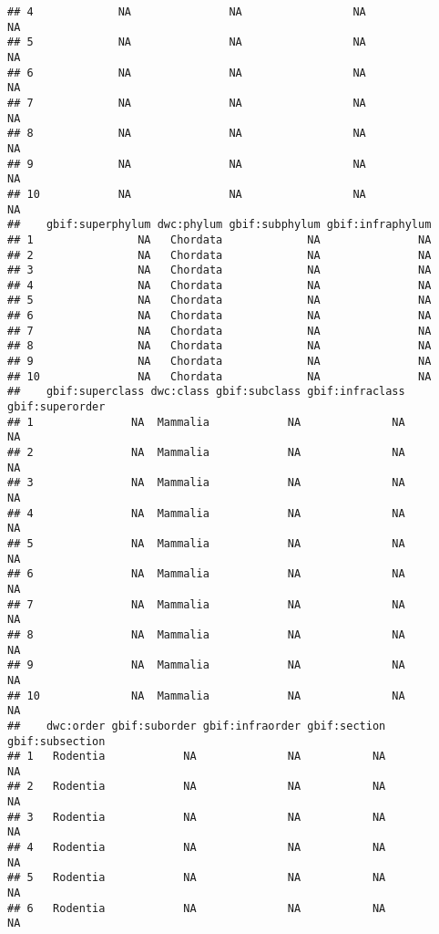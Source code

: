 \documentclass[]{book}
\begin{document}
\begin{verbatim}
## 4             NA               NA                 NA                NA
## 5             NA               NA                 NA                NA
## 6             NA               NA                 NA                NA
## 7             NA               NA                 NA                NA
## 8             NA               NA                 NA                NA
## 9             NA               NA                 NA                NA
## 10            NA               NA                 NA                NA
##    gbif:superphylum dwc:phylum gbif:subphylum gbif:infraphylum
## 1                NA   Chordata             NA               NA
## 2                NA   Chordata             NA               NA
## 3                NA   Chordata             NA               NA
## 4                NA   Chordata             NA               NA
## 5                NA   Chordata             NA               NA
## 6                NA   Chordata             NA               NA
## 7                NA   Chordata             NA               NA
## 8                NA   Chordata             NA               NA
## 9                NA   Chordata             NA               NA
## 10               NA   Chordata             NA               NA
##    gbif:superclass dwc:class gbif:subclass gbif:infraclass gbif:superorder
## 1               NA  Mammalia            NA              NA              NA
## 2               NA  Mammalia            NA              NA              NA
## 3               NA  Mammalia            NA              NA              NA
## 4               NA  Mammalia            NA              NA              NA
## 5               NA  Mammalia            NA              NA              NA
## 6               NA  Mammalia            NA              NA              NA
## 7               NA  Mammalia            NA              NA              NA
## 8               NA  Mammalia            NA              NA              NA
## 9               NA  Mammalia            NA              NA              NA
## 10              NA  Mammalia            NA              NA              NA
##    dwc:order gbif:suborder gbif:infraorder gbif:section gbif:subsection
## 1   Rodentia            NA              NA           NA              NA
## 2   Rodentia            NA              NA           NA              NA
## 3   Rodentia            NA              NA           NA              NA
## 4   Rodentia            NA              NA           NA              NA
## 5   Rodentia            NA              NA           NA              NA
## 6   Rodentia            NA              NA           NA              NA

\end{verbatim}
\end{document}
